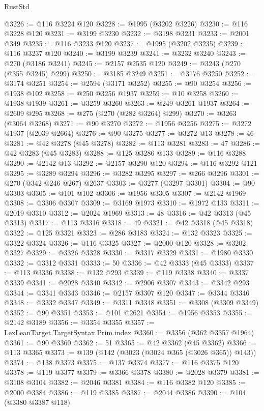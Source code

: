 \begin{lexlean}{RustStd}
\begin{coremodule}
@3226 := @116 @3224 @120
@3228 := @1995 (@3202 @3226)
@3230 := @116 @3228 @120
@3231 := @3199 @3230
@3232 := @3198 @3231
@3233 := @2001 @349
@3235 := @116 @3233 @120
@3237 := @1995 (@3202 @3235)
@3239 := @116 @3237 @120
@3240 := @3199 @3239
@3241 := @3232 @3240
@3243 := @270 (@3186 @3241)
@3245 := @2157 @2535 @120
@3249 := @3243 (@270 (@355 @3245) @299)
@3250 := @3185 @3249
@3251 := @3176 @3250
@3252 := @3174 @3251
@3254 := @2594 (@3171 @3252)
@3255 := @90 @3254
@3256 := @1938 @102
@3258 := @250 @3256 @1937
@3259 := @10 @3258
@3260 := @1938 @1939
@3261 := @3259 @3260
@3263 := @249 @3261 @1937
@3264 := @2609 @295
@3268 := @275 (@270 (@282 @3264) @299)
@3270 := @3263 (@3064 @3268)
@3271 := @90 @3270
@3272 := @1956 @3256
@3275 := @3272 @1937 (@2039 @2664)
@3276 := @90 @3275
@3277 := @3272 @13
@3278 := 46
@3281 := @42 @3278 (@45 @3278)
@3282 := @113 @3281
@3283 := 47
@3286 := @42 @3283 (@45 @3283)
@3288 := @125 @3286 @133
@3289 := @116 @3288
@3290 := @2142 @13
@3292 := @2157 @3290 @120
@3294 := @116 @3292 @121
@3295 := @3289 @3294
@3296 := @3282 @3295
@3297 := @266 @3296
@3301 := @270 (@342 @246 @267) @2637
@3303 := @3277 (@3297 @3301)
@3304 := @90 @3303
@3305 := @101 @102
@3306 := @1956 @3305
@3307 := @2142 @1969
@3308 := @3306 @3307
@3309 := @3169 @1973
@3310 := @1972 @133
@3311 := @2019 @3310
@3312 := @2024 @1969
@3313 := 48
@3316 := @42 @3313 (@45 @3313)
@3317 := @113 @3316
@3318 := 49
@3321 := @42 @3318 (@45 @3318)
@3322 := @125 @3321
@3323 := @286 @3183
@3324 := @132 @3323
@3325 := @3322 @3324
@3326 := @116 @3325
@3327 := @2000 @120
@3328 := @3202 @3327
@3329 := @3326 @3328
@3330 := @3317 @3329
@3331 := @1980 @3330
@3332 := @3312 @3331
@3333 := 50
@3336 := @42 @3333 (@45 @3333)
@3337 := @113 @3336
@3338 := @132 @293
@3339 := @119 @3338
@3340 := @3337 @3339
@3341 := @2028 @3340
@3342 := @2906 @3307
@3343 := @3342 @293
@3344 := @3341 @3343
@3346 := @2157 @3307 @120
@3347 := @3344 @3346
@3348 := @3332 @3347
@3349 := @3311 @3348
@3351 := @3308 (@3309 @3349)
@3352 := @90 @3351
@3353 := @101 @2621
@3354 := @1956 @3353
@3355 := @2142 @3189
@3356 := @3354 @3355
@3357 := LexLeanTarget.TargetSyntax.Prim.index
@3360 := @3356 (@362 @3357 @1964)
@3361 := @90 @3360
@3362 := 51
@3365 := @42 @3362 (@45 @3362)
@3366 := @113 @3365
@3373 := @139 (@142 (@3023 (@3024 @365 (@3026 @365)) @143))
@3374 := @138 @3373
@3375 := @137 @3374
@3377 := @116 @3375 @120
@3378 := @119 @3377
@3379 := @3366 @3378
@3380 := @2028 @3379
@3381 := @3108 @3104
@3382 := @2046 @3381
@3384 := @116 @3382 @120
@3385 := @2000 @3384
@3386 := @119 @3385
@3387 := @2044 @3386
@3390 := @104 (@3380 @3387 @118)

\end{coremodule}
\end{lexlean}
